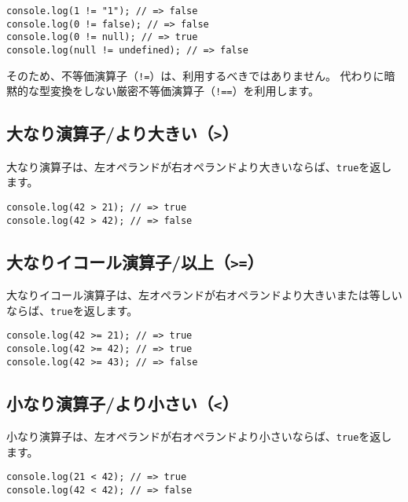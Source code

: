 \begin{lstlisting}
console.log(1 != "1"); // => false
console.log(0 != false); // => false
console.log(0 != null); // => true
console.log(null != undefined); // => false
\end{lstlisting}

そのため、不等価演算子（\texttt{!=}）は、利用するべきではありません。
代わりに暗黙的な型変換をしない厳密不等価演算子（\texttt{!==}）を利用します。

\hypertarget{more-than}{%
\subsection{\texorpdfstring{大なり演算子/より大きい（\texttt{\textgreater{}}）}{大なり演算子/より大きい（\textgreater{}）}}\label{more-than}}

大なり演算子は、左オペランドが右オペランドより大きいならば、\texttt{true}を返します。

\begin{lstlisting}
console.log(42 > 21); // => true
console.log(42 > 42); // => false
\end{lstlisting}

\hypertarget{more-than-equal}{%
\subsection{\texorpdfstring{大なりイコール演算子/以上（\texttt{\textgreater{}=}）}{大なりイコール演算子/以上（\textgreater{}=）}}\label{more-than-equal}}

大なりイコール演算子は、左オペランドが右オペランドより大きいまたは等しいならば、\texttt{true}を返します。

\begin{lstlisting}
console.log(42 >= 21); // => true
console.log(42 >= 42); // => true
console.log(42 >= 43); // => false
\end{lstlisting}

\hypertarget{less-than}{%
\subsection{\texorpdfstring{小なり演算子/より小さい（\texttt{\textless{}}）}{小なり演算子/より小さい（\textless{}）}}\label{less-than}}

小なり演算子は、左オペランドが右オペランドより小さいならば、\texttt{true}を返します。

\begin{lstlisting}
console.log(21 < 42); // => true
console.log(42 < 42); // => false
\end{lstlisting}

